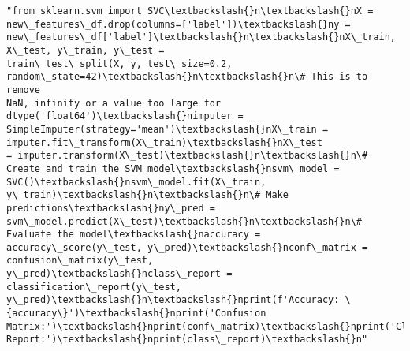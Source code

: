 \documentclass[11pt]{article}
\makeatletter
\newcommand{\boxspacing}{\kern\kvtcb@left@rule\kern\kvtcb@boxsep}
\newcommand{\prompt}[4]{
        {\ttfamily\llap{{\color{#2}[#3]:\hspace{3pt}#4}}\vspace{-\baselineskip}}
    }
\makeatother
\begin{document}
            \begin{tcolorbox}[breakable, size=fbox, boxrule=.5pt, pad at break*=1mm, opacityfill=0]
\prompt{Out}{outcolor}{25}{\boxspacing}
\begin{Verbatim}[commandchars=\\\{\}]
"from sklearn.svm import SVC\textbackslash{}n\textbackslash{}nX = new\_features\_df.drop(columns=['label'])\textbackslash{}ny =
new\_features\_df['label']\textbackslash{}n\textbackslash{}nX\_train, X\_test, y\_train, y\_test =
train\_test\_split(X, y, test\_size=0.2, random\_state=42)\textbackslash{}n\textbackslash{}n\# This is to remove
NaN, infinity or a value too large for dtype('float64')\textbackslash{}nimputer =
SimpleImputer(strategy='mean')\textbackslash{}nX\_train = imputer.fit\_transform(X\_train)\textbackslash{}nX\_test
= imputer.transform(X\_test)\textbackslash{}n\textbackslash{}n\# Create and train the SVM model\textbackslash{}nsvm\_model =
SVC()\textbackslash{}nsvm\_model.fit(X\_train, y\_train)\textbackslash{}n\textbackslash{}n\# Make predictions\textbackslash{}ny\_pred =
svm\_model.predict(X\_test)\textbackslash{}n\textbackslash{}n\# Evaluate the model\textbackslash{}naccuracy =
accuracy\_score(y\_test, y\_pred)\textbackslash{}nconf\_matrix = confusion\_matrix(y\_test,
y\_pred)\textbackslash{}nclass\_report = classification\_report(y\_test,
y\_pred)\textbackslash{}n\textbackslash{}nprint(f'Accuracy: \{accuracy\}')\textbackslash{}nprint('Confusion
Matrix:')\textbackslash{}nprint(conf\_matrix)\textbackslash{}nprint('Classification
Report:')\textbackslash{}nprint(class\_report)\textbackslash{}n"
\end{Verbatim}
\end{tcolorbox}
        
\end{document}
